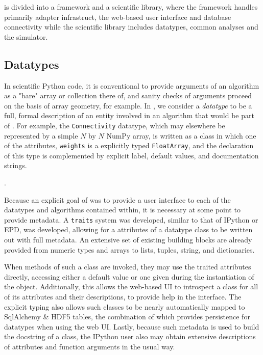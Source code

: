
\TVB is divided into a framework and a scientific library, where the framework
handles primarily adapter infrastruct, the web-based user interface and
database connectivity while the scientific library includes datatypes, 
common analyses and the simulator. 

\subsection{Datatypes}

In scientific Python code, it is conventional to provide arguments
of an algorithm as a "bare" array or collection there of, and sanity
checks of arguments proceed on the basis of array geometry, for example.
In \TVB, we consider a \textit{datatype} to be a full, formal description of 
an entity involved in an algorithm that would be part of \TVB. 
For example, the \texttt{Connectivity} datatype, which may elsewhere
be represented by a simple $N$ by $N$ NumPy array, is written as a class
in which one of the attributes, \texttt{weights} is a explicitly typed 
\texttt{FloatArray}, and the declaration of this type is complemented by
explicit label, default values, and documentation strings. 

.

Because an explicit goal of \TVB was to provide a user interface to each of the
datatypes and algorithms contained within, it is necessary at some point to
provide metadata. A \texttt{traits} system was developed, similar to that of
IPython or EPD, was developed, allowing for a attributes of a datatype class to
be written out with full metadata. An extensive set of existing building 
blocks are already provided from numeric types and arrays to lists, tuples, 
string, and dictionaries.


 When methods of such a class are invoked,
they may use the traited attributes directly, accessing either a default value
or one given during the instantiation of the object. Additionally, this allows
the web-based UI to introspect a class for all of its attributes and their
descriptions, to provide help in the interface. The explicit typing also allows
such classes to be nearly automatically mapped to SqlAlchemy \& HDF5 tables,
the combination of which provides persistence for datatypes when using the web
UI.  Lastly, because such metadata is used to build the docstring of a class,
the IPython user also may obtain extensive descriptions of attributes and
function arguments in the usual way. 


